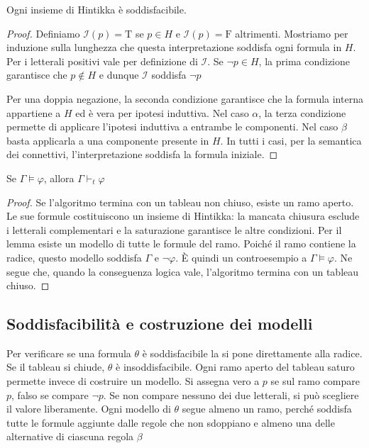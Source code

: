 \medskip
\noindent
\colorbox{SALZO}{\parbox{\dimexpr\linewidth-2\fboxsep}{
\begin{lemma}
    Ogni insieme di Hintikka è soddisfacibile.
\end{lemma}
}}%

\begin{proof}
    Definiamo $\mathcal{I}(p)=\mathrm{T}$ se $p\in H$ e
    $\mathcal{I}(p)=\mathrm{F}$ altrimenti. Mostriamo per
    induzione sulla lunghezza che questa interpretazione
    soddisfa ogni formula in $H$. Per i letterali positivi
    vale per definizione di $\mathcal{I}$. Se $\neg p\in H$,
    la prima condizione garantisce che $p\notin H$ e
    dunque $\mathcal{I}$ soddisfa $\neg p$

    \noindent
    Per una doppia negazione, la seconda condizione garantisce
    che la formula interna appartiene a $H$ ed è vera per
    ipotesi induttiva. Nel caso $\alpha$, la terza condizione
    permette di applicare l'ipotesi induttiva a entrambe le
    componenti. Nel caso $\beta$ basta applicarla a una
    componente presente in $H$. In tutti i casi, per la semantica
    dei connettivi, l'interpretazione soddisfa la formula iniziale.
\end{proof}

\noindent
\colorbox{SALZO}{\parbox{\dimexpr\linewidth-2\fboxsep}{
\begin{theorem}
    Se $\Gamma\models\varphi$, allora $\Gamma\vdash_t\varphi$
\end{theorem}
}}%

\begin{proof}
    Se l'algoritmo termina con un tableau non chiuso, esiste
    un ramo aperto. Le sue formule costituiscono un insieme di
    Hintikka: la mancata chiusura esclude i letterali
    complementari e la saturazione garantisce le altre condizioni.
    Per il lemma esiste un modello di tutte le formule del ramo.
    Poiché il ramo contiene la radice, questo modello soddisfa
    $\Gamma$ e $\neg\varphi$. È quindi un controesempio a
    $\Gamma\models\varphi$. Ne segue che, quando la conseguenza
    logica vale, l'algoritmo termina con un tableau chiuso.
\end{proof}

\subsection{Soddisfacibilità e costruzione dei modelli}
Per verificare se una formula $\theta$ è soddisfacibile la si
pone direttamente alla radice. Se il tableau si chiude,
$\theta$ è insoddisfacibile. Ogni ramo aperto del tableau
saturo permette invece di costruire un modello. Si assegna
vero a $p$ se sul ramo compare $p$, falso se compare $\neg p$.
Se non compare nessuno dei due letterali, si può scegliere il
valore liberamente. Ogni modello di $\theta$ segue almeno un
ramo, perché soddisfa tutte le formule aggiunte dalle regole
che non sdoppiano e almeno una delle alternative di ciascuna
regola $\beta$

